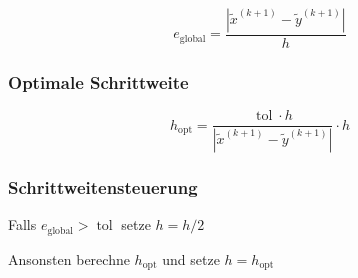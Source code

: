 \documentclass[a4paper, twoside]{article}
\begin{document}
\[e_{\text{global}} = \frac{|\tilde{x}^{(k+1)} - \tilde{y}^{(k+1)}|}{h}\]

\subsubsection{Optimale Schrittweite}

\[h_{\text{opt}} = \frac{\operatorname{tol} \cdot h}{|\tilde{x}^{(k+1)} - \tilde{y}^{(k+1)}|} \cdot h\]

\subsubsection{Schrittweitensteuerung}

Falls \(e_{\text{global}} > \operatorname{tol}\) setze \(h = h/2\)

Ansonsten berechne \(h_{\text{opt}}\) und setze \(h = h_{\text{opt}}\)
\end{document}
